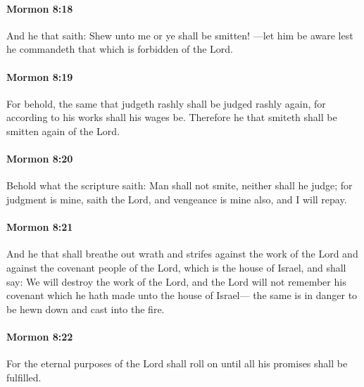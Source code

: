 		\paragraph{Mormon 8:18} %
			\label{MORMON-8-18}

			And he that saith:
			Shew unto me or ye shall be smitten!
			---let him be aware lest he commandeth
			that which is forbidden of the Lord.

		\paragraph{Mormon 8:19} %
			\label{MORMON-8-19}

			For behold, the same that judgeth rashly shall be judged rashly again,
			for according to his works shall his wages be.
			Therefore he that smiteth shall be smitten again of the Lord.

		\paragraph{Mormon 8:20} %
			\label{MORMON-8-20}

			Behold what the scripture saith:
			Man shall not smite, neither shall he judge;
			for judgment is mine, saith the Lord,
			and vengeance is mine also, and I will repay.

		\paragraph{Mormon 8:21} %
			\label{MORMON-8-21}

			And he that shall breathe out wrath and strifes against the work of the Lord
			and against the covenant people of the Lord, which is the house of Israel,
			and shall say:
			We will destroy the work of the Lord,
			and the Lord will not remember his covenant
			which he hath made unto the house of Israel---
			the same is in danger to be hewn down and cast into the fire.

		\paragraph{Mormon 8:22} %
			\label{MORMON-8-22}

			For the eternal purposes of the Lord shall roll on
			until all his promises shall be fulfilled.

